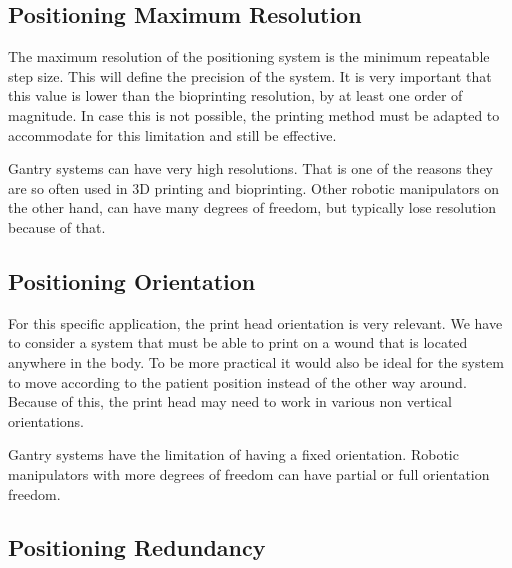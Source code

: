 
\subsection{Positioning Maximum Resolution}
\label{subsec:system_architecture_requirements_positioning_max_resolution}

The maximum resolution of the positioning system is the minimum repeatable step size. This will define the precision of the system. It is very important that this value is lower than the bioprinting resolution, by at least one order of magnitude. In case this is not possible, the printing method must be adapted to accommodate for this limitation and still be effective.

Gantry systems can have very high resolutions. That is one of the reasons they are so often used in 3D printing and bioprinting. Other robotic manipulators on the other hand, can have many degrees of freedom, but typically lose resolution because of that.


\subsection{Positioning Orientation}
\label{subsec:system_architecture_requirements_positioning_orientation}

For this specific application, the print head orientation is very relevant. We have to consider a system that must be able to print on a wound that is located anywhere in the body. To be more practical it would also be ideal for the system to move according to the patient position instead of the other way around. Because of this, the print head may need to work in various non vertical orientations.

Gantry systems have the limitation of having a fixed orientation. Robotic manipulators with more degrees of freedom can have partial or full orientation freedom.


\subsection{Positioning Redundancy}
\label{subsec:system_architecture_requirements_positioning_redundancy}

